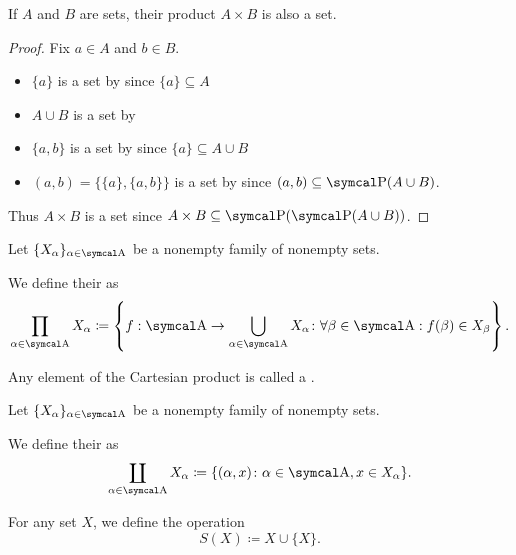 \begin{proposition}\label{def:binary_cartesian_product_is_set}
  If \( A \) and \( B \) are sets, their product \( A \times B \) is also a set.
\end{proposition}
\begin{proof}
  Fix \( a \in A \) and \( b \in B \).
  \begin{itemize}
    \item \( \{ a \} \) is a set by  since \( \{ a \} \subseteq A \)
    \item \( A \cup B \) is a set by 
    \item \( \{ a, b \} \) is a set by  since \( \{ a \} \subseteq A \cup B \)
    \item \( (a, b) = \{ \{ a \}, \{ a, b \} \} \) is a set by  since \( (a, b) \subseteq \Power(A \cup B) \).
  \end{itemize}

  Thus \( A \times B \) is a set since \( A \times B \subseteq \Power(\Power(A \cup B)) \).
\end{proof}

\begin{definition}\label{def:cartesian_product}\cite[54]{Enderton1977}
  Let \( \{ X_\al \}_{\al \in \CA} \) be a nonempty family of nonempty sets.

  We define their  as
  \begin{equation*}
    \prod_{\al \in \CA} X_\al \coloneqq \left\{ f: \CA \to \bigcup_{\al \in \CA} X_\al \colon \forall \beta \in \CA: f(\beta) \in X_\beta \right\}.
  \end{equation*}

  Any element of the Cartesian product is called a .
\end{definition}

\begin{definition}\label{def:disjoint_union}
  Let \( \{ X_\al \}_{\al \in \CA} \) be a nonempty family of nonempty sets.

  We define their  as
  \begin{equation*}
    \coprod_{\al \in \CA} X_\al \coloneqq \{ (\al, x) \colon \al \in \CA, x \in X_\al \}.
  \end{equation*}
\end{definition}

\begin{definition}\label{def:successor_operator}\cite[68]{Enderton1977}
  For any set \( X \), we define the  operation
  \begin{equation*}
    S(X) \coloneqq X \cup \{ X \}.
  \end{equation*}
\end{definition}

